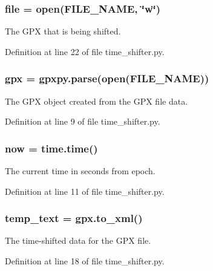 \subsubsection[{\texorpdfstring{file}{file}}]{\setlength{\rightskip}{0pt plus 5cm}file = open(F\+I\+L\+E\+\_\+\+N\+A\+ME, \char`\"{}w\char`\"{})}\hypertarget{namespacetime__shifter_a40a5d58ffa6e88aa578d6683ac413105}{}\label{namespacetime__shifter_a40a5d58ffa6e88aa578d6683ac413105}


The G\+PX that is being shifted. 



Definition at line 22 of file time\+\_\+shifter.\+py.

\subsubsection[{\texorpdfstring{gpx}{gpx}}]{\setlength{\rightskip}{0pt plus 5cm}gpx = gpxpy.\+parse(open(F\+I\+L\+E\+\_\+\+N\+A\+ME))}\hypertarget{namespacetime__shifter_a701030976c24adaa37c6bbf9af499ac8}{}\label{namespacetime__shifter_a701030976c24adaa37c6bbf9af499ac8}


The G\+PX object created from the G\+PX file data. 



Definition at line 9 of file time\+\_\+shifter.\+py.

\subsubsection[{\texorpdfstring{now}{now}}]{\setlength{\rightskip}{0pt plus 5cm}now = time.\+time()}\hypertarget{namespacetime__shifter_afdc24ca189ea1f66dfd9245b4c970d59}{}\label{namespacetime__shifter_afdc24ca189ea1f66dfd9245b4c970d59}


The current time in seconds from epoch. 



Definition at line 11 of file time\+\_\+shifter.\+py.

\subsubsection[{\texorpdfstring{temp\+\_\+text}{temp_text}}]{\setlength{\rightskip}{0pt plus 5cm}temp\+\_\+text = gpx.\+to\+\_\+xml()}\hypertarget{namespacetime__shifter_acfe3ecceec8adb15641afbf1805061dc}{}\label{namespacetime__shifter_acfe3ecceec8adb15641afbf1805061dc}


The time-\/shifted data for the G\+PX file. 



Definition at line 18 of file time\+\_\+shifter.\+py.

